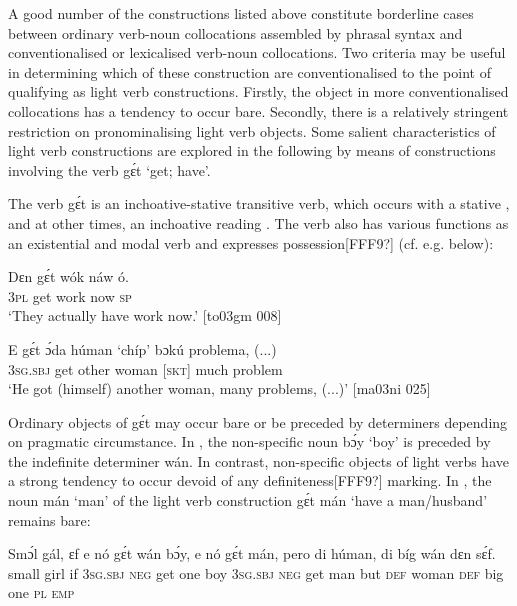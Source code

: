 A good number of the constructions listed above constitute borderline cases between ordinary verb-noun collocations assembled by phrasal syntax and conventionalised or lexicalised verb-noun collocations. Two criteria may be useful in determining which of these construction are conventionalised to the point of qualifying as light verb constructions. Firstly, the object in more conventionalised collocations has a tendency to occur bare. Secondly, there is a relatively stringent restriction on pronominalising light verb objects. Some salient characteristics of light verb constructions are explored in the following by means of constructions involving the verb gɛ́t ‘get; have’.


The verb gɛ́t is an inchoative-stative transitive verb, which occurs with a stative , and at other times, an inchoative reading . The verb also has various functions as an existential and modal verb and expresses possession[FFF9?] (cf. e.g.  below):



\ea%
    \label{ex:key:1157}
    \gll Dɛn  gɛ́t  wók    náw    ó.\\
\textsc{3pl}  get  work  now    \textsc{sp}\\

\glt ‘They actually have work now.’ [to03gm 008]
\z


\ea%
    \label{ex:key:1158}
    \gll E    gɛ́t  ɔ́da    húman  ‘chíp’  bɔkú  problema,  (...)\\
\textsc{3sg.sbj}  get  other  woman  \textsc{[skt]}    much  problem\\

\glt ‘He got (himself) another woman, many problems, (...)’ [ma03ni 025]
\z

Ordinary objects of gɛ́t may occur bare or be preceded by determiners depending on pragmatic circumstance. In , the non-specific noun bɔ́y ‘boy’ is preceded by the indefinite determiner wán. In contrast, non-specific objects of light verbs have a strong tendency to occur devoid of any definiteness[FFF9?] marking. In , the noun mán ‘man’ of the light verb construction gɛ́t mán ‘have a man/husband’ remains bare: 


\ea%
    \label{ex:key:1159}
    \gll Smɔ́l  gál,  ɛf  e    nó  gɛ́t  wán  bɔ́y,    e    nó  gɛ́t  mán,
pero  di  húman,  di  bíg  wán    dɛn  sɛ́f.\\
small  girl  if  \textsc{3sg.sbj}  \textsc{neg}  get  one  boy    \textsc{3sg.sbj}  \textsc{neg}  get  man
but    \textsc{def}  woman  \textsc{def}  big  one    \textsc{pl}  \textsc{emp}\\


